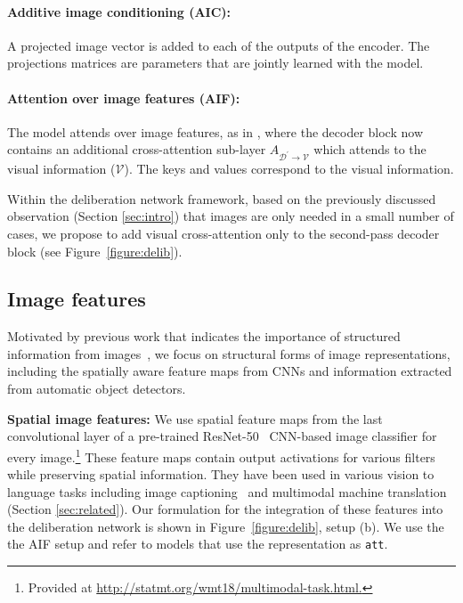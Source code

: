 \documentclass[11pt,a4paper]{article}
\begin{document}
\paragraph{Additive image conditioning (AIC):} A
projected image vector is added to each of the outputs of the encoder. The projections matrices are parameters that are jointly learned with the model.

\paragraph{Attention over image features (AIF):} The model attends over image features, as in , where the decoder block now contains an additional cross-attention sub-layer 
$A_{\mathcal{D^{'}}{\rightarrow}\mathcal{V}}$ which attends to the visual information ($\mathcal{V}$). The keys and values correspond to the visual information.

Within the deliberation network framework, based on the previously discussed observation (Section \ref{sec:intro}) that images are only needed in a small number of cases, we propose to add visual cross-attention only to the second-pass decoder block (see Figure~\ref{figure:delib}).

\subsection{Image features}\label{ssec:img-info}
Motivated by previous work that indicates the importance of structured information from images~\cite{CaglayanEtAl:2017,wang2018object,madhyastha2018end}, we focus on structural forms of image representations, including the spatially aware feature maps from CNNs and information extracted from automatic  object detectors. 

\textbf{Spatial image features:} We use spatial feature maps from the last convolutional layer of a pre-trained ResNet-50~\cite{he2016deep} CNN-based image classifier for every image.\footnote{Provided at  \url{http://statmt.org/wmt18/multimodal-task.html.}}  These feature maps contain output activations for various filters while preserving spatial information. They have been used in various vision to language tasks including image captioning~\cite{XuEtAl:2015} and  multimodal machine translation (Section \ref{sec:related}). 
Our formulation for the integration of these features into the deliberation network is shown in Figure~\ref{figure:delib}, setup (b). We use the the AIF setup and refer to models that use the representation as \texttt{att}. 
\end{document}
